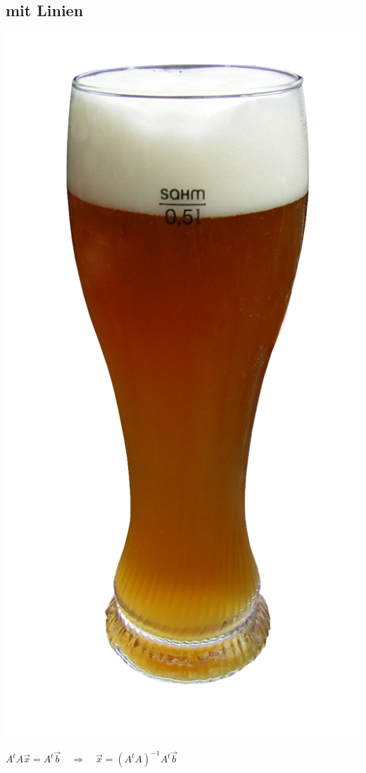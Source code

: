 		\subsection{\textbf{mit} Linien}
			\begin{minipage}{4.5cm}
				\includegraphics[width=\textwidth]{./images/Weizenbier.jpg}
			\end{minipage} \qquad \vline \qquad			
			\begin{minipage}{0.5\textwidth}
				$\boxed{A^{t} A \vec{x}=A^{t} \vec{b} \quad \Rightarrow \quad \vec{x}=\left(A^{t} A\right)^{-1} A^{t} \vec{b}}$
			\end{minipage}
	
